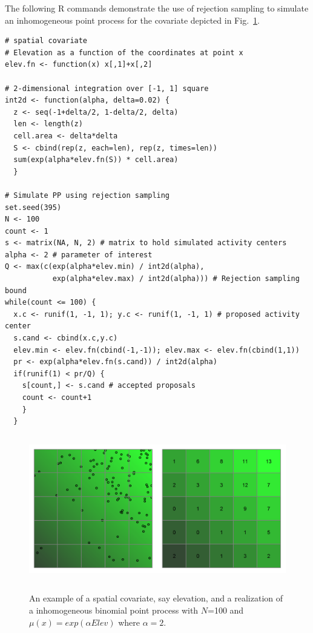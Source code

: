 The following R commands demonstrate the use of rejection sampling to
simulate an inhomogeneous point process for the covariate depicted in
Fig.~\ref{ch9:fig:elevMap}.


\begin{small}
\begin{verbatim}
# spatial covariate
# Elevation as a function of the coordinates at point x
elev.fn <- function(x) x[,1]+x[,2]

# 2-dimensional integration over [-1, 1] square
int2d <- function(alpha, delta=0.02) {
  z <- seq(-1+delta/2, 1-delta/2, delta)
  len <- length(z)
  cell.area <- delta*delta
  S <- cbind(rep(z, each=len), rep(z, times=len))
  sum(exp(alpha*elev.fn(S)) * cell.area)
  }

# Simulate PP using rejection sampling
set.seed(395)
N <- 100
count <- 1
s <- matrix(NA, N, 2) # matrix to hold simulated activity centers
alpha <- 2 # parameter of interest
Q <- max(c(exp(alpha*elev.min) / int2d(alpha),
           exp(alpha*elev.max) / int2d(alpha))) # Rejection sampling bound
while(count <= 100) {
  x.c <- runif(1, -1, 1); y.c <- runif(1, -1, 1) # proposed activity center
  s.cand <- cbind(x.c,y.c)
  elev.min <- elev.fn(cbind(-1,-1)); elev.max <- elev.fn(cbind(1,1))
  pr <- exp(alpha*elev.fn(s.cand)) / int2d(alpha)
  if(runif(1) < pr/Q) {
    s[count,] <- s.cand # accepted proposals
    count <- count+1
    }
  }
\end{verbatim}
\end{small}


\begin{figure}
\centering
\includegraphics[width=5in,height=2.5in]{figs/heteroPlots}%
\label{ch9:fig:elevMap}
\caption{An example of a spatial covariate, say elevation, and a
  realization of a inhomogeneous binomial point process with $N$=100
  and $\mu(x) = exp(\alpha Elev)$ where $\alpha=2$.}
\end{figure}

